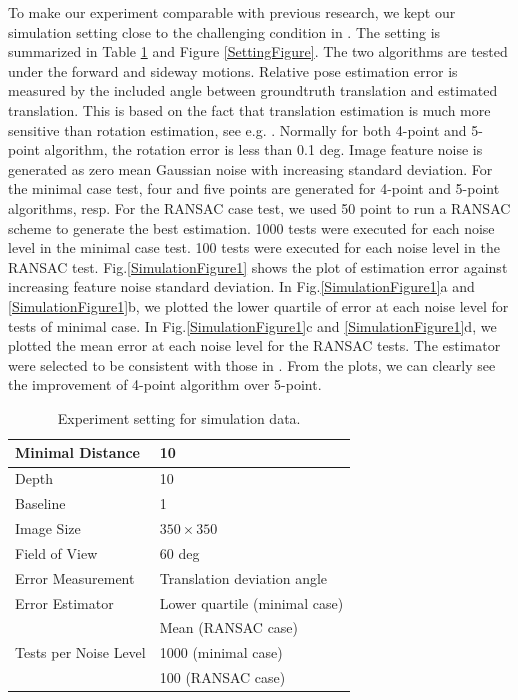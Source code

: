 \documentclass[letterpaper, 10 pt, conference]{ieeeconf}
\begin{document}
To make our experiment comparable with previous research, we kept our simulation setting close to the challenging condition in \cite{nister2004efficient}. The setting is summarized in Table \ref{SettingTable} and Figure \ref{SettingFigure}. The two algorithms are tested under the forward and sideway motions. Relative pose estimation error is measured by the included angle between groundtruth translation and estimated translation. This is based on the fact that translation estimation is much more sensitive than rotation estimation, see e.g. \cite{tian1996comparison}. Normally for both 4-point and 5-point algorithm, the rotation error is less than 0.1 deg. Image feature noise is generated as zero mean Gaussian noise with increasing standard deviation. For the minimal case test, four and five points are generated for 4-point and 5-point algorithms, resp. For the RANSAC case test, we used 50 point to run a RANSAC scheme to generate the best estimation. 1000 tests were executed for each noise level in the minimal case test. 100 tests were executed for each noise level in the RANSAC test. Fig.\ref{SimulationFigure1} shows the plot of estimation error against increasing feature noise standard deviation.  In Fig.\ref{SimulationFigure1}a and \ref{SimulationFigure1}b, we plotted the lower quartile of error at each noise level for tests of minimal case. In Fig.\ref{SimulationFigure1}c and \ref{SimulationFigure1}d, we plotted the mean error at each noise level for the RANSAC tests. The estimator were selected to be consistent with those in \cite{nister2004efficient}. From the plots, we can clearly see the improvement of 4-point algorithm over 5-point. 

\begin{table}
\caption{Experiment setting for simulation data. }
\begin{center}
\begin{tabular}{|l|l|}
	\hline	
	Minimal Distance & 10 \\
	\hline
	Depth & 10 \\
	\hline
	Baseline & 1 \\
	\hline
	Image Size & $350 \times 350$ \\ 
	\hline	
	Field of View & 60 deg \\
	\hline	
	Error Measurement & Translation deviation angle \\ 
	\hline	
	Error Estimator & Lower quartile (minimal case) \\
	& Mean (RANSAC case) \\
	\hline
	Tests per Noise Level & 1000 (minimal case) \\
	& 100 (RANSAC case) \\
	\hline	
\end{tabular} 
\end{center}
\label{SettingTable}
\end{table}
\end{document}
